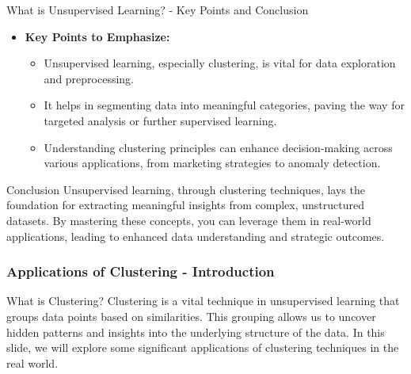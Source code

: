 \documentclass[aspectratio=169]{beamer}
\begin{document}
\begin{frame}[fragile]{What is Unsupervised Learning? - Key Points and Conclusion}
    \begin{itemize}
        \item \textbf{Key Points to Emphasize:}
        \begin{itemize}
            \item Unsupervised learning, especially clustering, is vital for data exploration and preprocessing.
            \item It helps in segmenting data into meaningful categories, paving the way for targeted analysis or further supervised learning.
            \item Understanding clustering principles can enhance decision-making across various applications, from marketing strategies to anomaly detection.
        \end{itemize}
    \end{itemize}
    
    \begin{block}{Conclusion}
        Unsupervised learning, through clustering techniques, lays the foundation for extracting meaningful insights from complex, unstructured datasets. By mastering these concepts, you can leverage them in real-world applications, leading to enhanced data understanding and strategic outcomes.
    \end{block}
\end{frame}

\begin{frame}[fragile]
  \frametitle{Applications of Clustering - Introduction}
  \begin{block}{What is Clustering?}
    Clustering is a vital technique in unsupervised learning that groups data points based on similarities. 
    This grouping allows us to uncover hidden patterns and insights into the underlying structure of the data.
    In this slide, we will explore some significant applications of clustering techniques in the real world.
  \end{block}
\end{frame}
\end{document}
